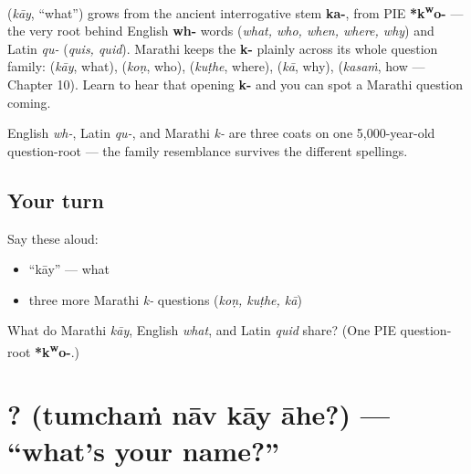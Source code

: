 \begin{cousinweb}
\textbf{} (\emph{kāy}, \textquotedblleft{}what\textquotedblright{}) grows from the ancient interrogative stem \textbf{ka-}, from PIE \textbf{*k\textsuperscript{w}o-} — the very root behind English \textbf{wh-} words (\emph{what, who, when, where, why}) and Latin \emph{qu-} (\emph{quis, quid}). Marathi keeps the \textbf{k-} plainly across its whole question family: \textbf{} (\emph{kāy}, what), \textbf{} (\emph{koṇ}, who), \textbf{} (\emph{kuṭhe}, where), \textbf{} (\emph{kā}, why), \textbf{} (\emph{kasaṁ}, how — Chapter 10). Learn to hear that opening \textbf{k-} and you can spot a Marathi question coming.
\end{cousinweb}

\begin{culture}
English \emph{wh-}, Latin \emph{qu-}, and Marathi \emph{k-} are three coats on one 5,000-year-old question-root — the family resemblance survives the different spellings.
\end{culture}

\subsection*{Your turn}
Say these aloud:

\begin{itemize}
\raggedright
  \item \textquotedblleft{}kāy\textquotedblright{} — what
  \item three more Marathi \emph{k-} questions (\emph{koṇ, kuṭhe, kā})
\end{itemize}

\begin{tcolorbox}[breakable,colback=teal!4,colframe=teal!35!black,title={Before you move on}]
What do Marathi \emph{kāy}, English \emph{what}, and Latin \emph{quid} share? (One PIE question-root \textbf{*k\textsuperscript{w}o-}.)
\end{tcolorbox}
\section[\texorpdfstring{\mr{तुमचं} \mr{नाव} \mr{काय} \mr{आहे}? (tumchaṁ nāv kāy āhe?)}{तुमचं नाव काय आहे? (tumchaṁ nāv kāy āhe?)}]{   ? (tumchaṁ nāv kāy āhe?) — \textquotedblleft{}what's your name?\textquotedblright{}}

\label{lesson:MR-C02-tumche-naav-kaay-aahe}



